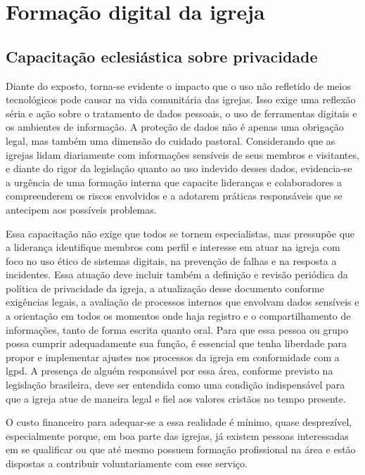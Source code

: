 \section{Formação digital da igreja}

\subsection{Capacitação eclesiástica sobre privacidade}

Diante do exposto, torna-se evidente o impacto que o uso não refletido de meios tecnológicos pode causar na vida comunitária das igrejas. Isso exige uma reflexão séria e ação sobre o tratamento de dados pessoais, o uso de ferramentas digitais e os ambientes de informação. A proteção de dados não é apenas uma obrigação legal, mas também uma dimensão do cuidado pastoral. Considerando que as igrejas lidam diariamente com informações sensíveis de seus membros e visitantes, e diante do rigor da legislação quanto ao uso indevido desses dados, evidencia-se a urgência de uma formação interna que capacite lideranças e colaboradores a compreenderem os riscos envolvidos e a adotarem práticas responsáveis que se antecipem aos possíveis problemas.

Essa capacitação não exige que todos se tornem especialistas, mas pressupõe que a liderança identifique membros com perfil e interesse em atuar na igreja com foco no uso ético de sistemas digitais, na prevenção de falhas e na resposta a incidentes. Essa atuação deve incluir também a definição e revisão periódica da política de privacidade da igreja, a atualização desse documento conforme exigências legais, a avaliação de processos internos que envolvam dados sensíveis e a orientação em todos os momentos onde haja registro e o compartilhamento de informações, tanto de forma escrita quanto oral. Para que essa pessoa ou grupo possa cumprir adequadamente sua função, é essencial que tenha liberdade para propor e implementar ajustes nos processos da igreja em conformidade com a \gls{lgpd}. A presença de alguém responsável por essa área, conforme previsto na legislação brasileira, deve ser entendida como uma condição indispensável para que a igreja atue de maneira legal e fiel aos valores cristãos no tempo presente.

O custo financeiro para adequar-se a essa realidade é mínimo, quase desprezível, especialmente porque, em boa parte das igrejas, já existem pessoas interessadas em se qualificar ou que até mesmo possuem formação profissional na área e estão dispostas a contribuir voluntariamente com esse serviço.

